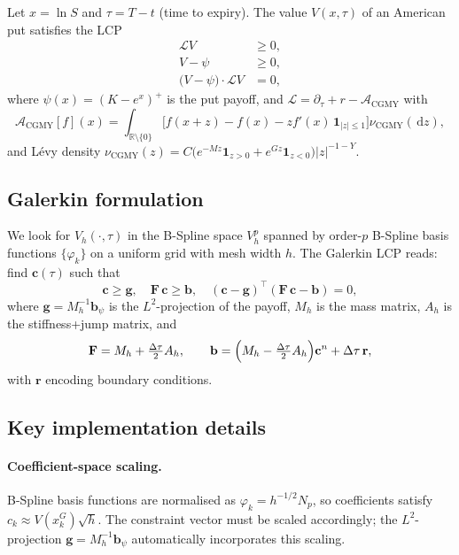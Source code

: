 \documentclass[11pt,a4paper]{article}
\newcommand{\CGMY}{\mathrm{CGMY}}
\newcommand{\dd}{\,\mathrm{d}}
\newcommand{\R}{\mathbb{R}}
\begin{document}
Let $x = \ln S$ and $\tau = T - t$ (time to expiry).  The value
$V(x,\tau)$ of an American put satisfies the LCP
\begin{align}
  \mathcal{L} V &\ge 0, \label{eq:lcp1}\\
  V - \psi &\ge 0, \label{eq:lcp2}\\
  \bigl(V - \psi\bigr)\cdot\mathcal{L} V &= 0, \label{eq:lcp3}
\end{align}
where $\psi(x) = (K-e^x)^+$ is the put payoff, and
$\mathcal{L} = \partial_\tau + r - \mathcal{A}_{\CGMY}$ with
\begin{equation}
  \mathcal{A}_{\CGMY}[f](x) = \int_{\R\setminus\{0\}}
  \bigl[f(x+z)-f(x)-z f'(x)\,\mathbf{1}_{|z|\le 1}\bigr]
  \nu_{\CGMY}(\dd z),
\end{equation}
and L\'evy density
$\nu_{\CGMY}(z) = C\bigl(e^{-M z}\mathbf{1}_{z>0}+e^{Gz}\mathbf{1}_{z<0}\bigr)|z|^{-1-Y}$.

\subsection{Galerkin formulation}

We look for $V_h(\cdot,\tau)$ in the B-Spline space $V_h^p$ spanned by
order-$p$ B-Spline basis functions $\{\varphi_k\}$ on a uniform grid with
mesh width $h$.  The Galerkin LCP reads: find $\mathbf{c}(\tau)$ such that
\begin{equation}
  \mathbf{c} \ge \mathbf{g},\quad
  \mathbf{F}\,\mathbf{c} \ge \mathbf{b},\quad
  (\mathbf{c}-\mathbf{g})^\top(\mathbf{F}\,\mathbf{c}-\mathbf{b}) = 0,
\end{equation}
where $\mathbf{g} = M_h^{-1}\mathbf{b}_\psi$ is the $L^2$-projection of
the payoff, $M_h$ is the mass matrix, $A_h$ is the stiffness+jump matrix, and
\begin{equation}
  \mathbf{F} = M_h + \tfrac{\Delta\tau}{2}A_h, \qquad
  \mathbf{b} = \Bigl(M_h - \tfrac{\Delta\tau}{2}A_h\Bigr)\mathbf{c}^{n}
  + \Delta\tau\,\mathbf{r},
\end{equation}
with $\mathbf{r}$ encoding boundary conditions.

\subsection{Key implementation details}

\paragraph{Coefficient-space scaling.}
B-Spline basis functions are normalised as $\varphi_k = h^{-1/2}N_p$, so
coefficients satisfy $c_k \approx V(x_k^G)\sqrt{h}$.  The constraint vector
must be scaled accordingly; the $L^2$-projection $\mathbf{g}=M_h^{-1}\mathbf{b}_\psi$
automatically incorporates this scaling.
\end{document}
